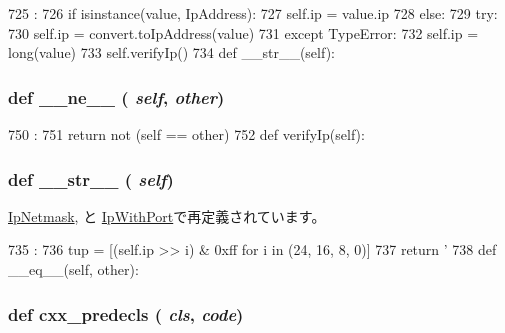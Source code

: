 \begin{DoxyCode}
725                              :
726         if isinstance(value, IpAddress):
727             self.ip = value.ip
728         else:
729             try:
730                 self.ip = convert.toIpAddress(value)
731             except TypeError:
732                 self.ip = long(value)
733         self.verifyIp()
734 
    def __str__(self):
\end{DoxyCode}
\hypertarget{classm5_1_1params_1_1IpAddress_ad69df72a6bf0be3525fe45cd2f77f343}{
\subsubsection[{\_\-\_\-ne\_\-\_\-}]{\setlength{\rightskip}{0pt plus 5cm}def \_\-\_\-ne\_\-\_\- ( {\em self}, \/   {\em other})}}
\label{classm5_1_1params_1_1IpAddress_ad69df72a6bf0be3525fe45cd2f77f343}



\begin{DoxyCode}
750                            :
751         return not (self == other)
752 
    def verifyIp(self):
\end{DoxyCode}
\hypertarget{classm5_1_1params_1_1IpAddress_aa7a4b9bc0941308e362738503137460e}{
\subsubsection[{\_\-\_\-str\_\-\_\-}]{\setlength{\rightskip}{0pt plus 5cm}def \_\-\_\-str\_\-\_\- ( {\em self})}}
\label{classm5_1_1params_1_1IpAddress_aa7a4b9bc0941308e362738503137460e}


\hyperlink{classm5_1_1params_1_1IpNetmask_aa7a4b9bc0941308e362738503137460e}{IpNetmask}, と \hyperlink{classm5_1_1params_1_1IpWithPort_aa7a4b9bc0941308e362738503137460e}{IpWithPort}で再定義されています。


\begin{DoxyCode}
735                      :
736         tup = [(self.ip >> i)  & 0xff for i in (24, 16, 8, 0)]
737         return '%
738 
    def __eq__(self, other):
\end{DoxyCode}
\hypertarget{classm5_1_1params_1_1IpAddress_a0b408a11a14bd1d770e28f71a6e14ab5}{
\subsubsection[{cxx\_\-predecls}]{\setlength{\rightskip}{0pt plus 5cm}def cxx\_\-predecls ( {\em cls}, \/   {\em code})}}
\label{classm5_1_1params_1_1IpAddress_a0b408a11a14bd1d770e28f71a6e14ab5}


